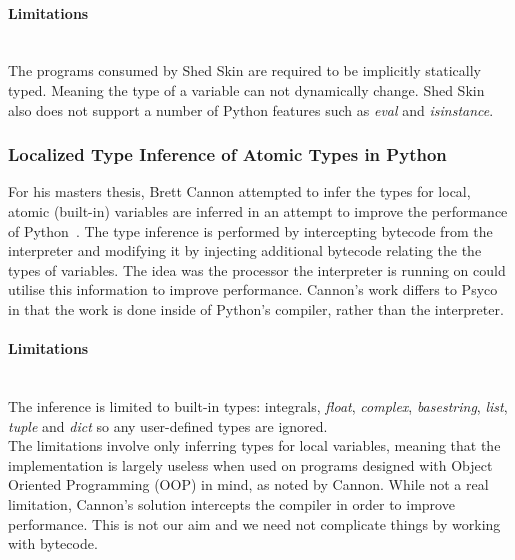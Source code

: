 \documentclass[12pt, titlepage]{article}
\begin{document}
\paragraph*{Limitations}\mbox{}\\
The programs consumed by Shed Skin are required to be implicitly statically typed. Meaning the type of a variable can not dynamically change. Shed Skin also does not support a number of Python features such as \textit{eval} and \textit{isinstance}.

\subsubsection{Localized Type Inference of Atomic Types in Python}
For his masters thesis, Brett Cannon attempted to infer the types for local, atomic (built-in) variables are inferred in an attempt to improve the performance of Python~\cite{cannonlocalizedtype}. The type inference is performed by intercepting bytecode from the interpreter and modifying it by injecting additional bytecode relating the the types of variables. The idea was the processor the interpreter is running on could utilise this information to improve performance. Cannon's work differs to Psyco in that the work is done inside of Python's compiler, rather than the interpreter.
\paragraph{Limitations}\mbox{}\\
The inference is limited to built-in types: integrals, \textit{float}, \textit{complex}, \textit{basestring}, \textit{list}, \textit{tuple} and \textit{dict} so any user-defined types are ignored. \\
The limitations involve only inferring types for local variables, meaning that the implementation is largely useless when used on programs designed with Object Oriented Programming (OOP) in mind, as noted by Cannon. While not a real limitation, Cannon's solution intercepts the compiler in order to improve performance. This is not our aim and we need not complicate things by working with bytecode.

\end{document}
